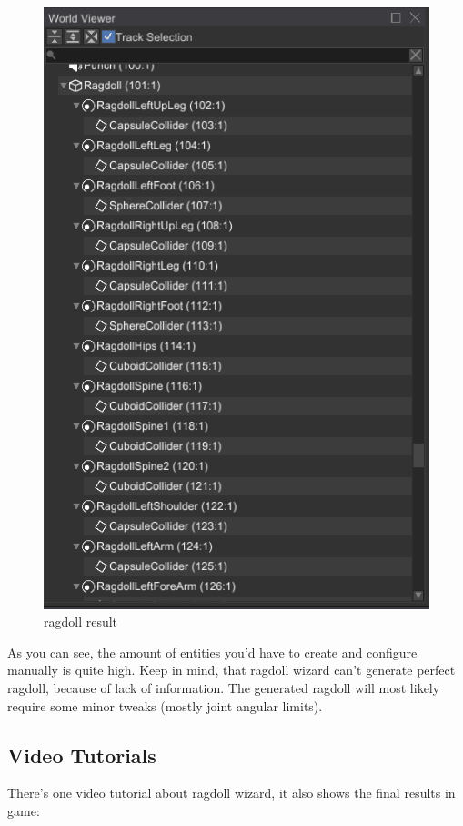 \documentclass[
]{book}
\theoremstyle{definition}
\theoremstyle{definition}
\theoremstyle{definition}
\theoremstyle{definition}
\theoremstyle{remark}
\begin{document}
\begin{figure}
\centering
\includegraphics{images/physics_ragdoll2.png}
\caption{ragdoll result}
\end{figure}

As you can see, the amount of entities you'd have to create and configure manually is quite high. Keep in mind, that ragdoll wizard can't generate perfect ragdoll, because of lack of information. The generated ragdoll will most likely require some minor tweaks (mostly joint angular limits).

\subsection{Video Tutorials}\label{video-tutorials}

There's one video tutorial about ragdoll wizard, it also shows the final results in game:
\end{document}
